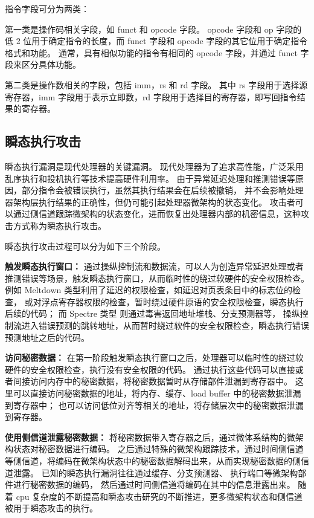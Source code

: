 指令字段可分为两类：\par

第一类是操作码相关字段，如 funct 和 opcode 字段。
opcode 字段和 op 字段的低 2 位用于确定指令的长度，而 funct 字段和 opcode 字段的其它位用于确定指令格式和功能。
通常，具有相似功能的指令有相同的 opcode 字段，并通过 funct 字段来区分具体功能。\par

第二类是操作数相关的字段，包括 imm，rs 和 rd 字段。
其中 rs 字段用于选择源寄存器，imm 字段用于表示立即数，rd 字段用于选择目的寄存器，即写回指令结果的寄存器。\par

\subsection{瞬态执行攻击}
瞬态执行漏洞是现代处理器的关键漏洞。
现代处理器为了追求高性能，广泛采用乱序执行和投机执行等技术提高硬件利用率。
由于异常延迟处理和推测错误等原因，部分指令会被错误执行，虽然其执行结果会在后续被撤销，
并不会影响处理器架构层执行结果的正确性，但仍可能引起处理器微架构的状态变化。
攻击者可以通过侧信道跟踪微架构的状态变化，进而恢复出处理器内部的机密信息，这种攻击方式称为瞬态执行攻击。\par

瞬态执行攻击过程可以分为如下三个阶段。\par

\textbf{触发瞬态执行窗口：}
通过操纵控制流和数据流，可以人为创造异常延迟处理或者推测错误等场景，触发瞬态执行窗口，从而临时性的绕过软硬件的安全权限检查。
例如 Meltdown 类型利用了延迟的权限检查，如延迟对页表条目中的标志位的检查\cite{horn2018meltdown}，
或对浮点寄存器权限的检查\cite{stecklina1806lazyfp}，暂时绕过硬件原语的安全权限检查，瞬态执行后续的代码；
而 Spectre 类型\cite{kocher2020spectre} 则通过毒害返回地址堆栈\cite{maisuradze2018ret2spec}、分支预测器等，
操纵控制流进入错误预测的跳转地址，从而暂时绕过软件的安全权限检查，瞬态执行错误预测地址之后的代码。\par

\textbf{访问秘密数据：}
在第一阶段触发瞬态执行窗口之后，处理器可以临时性的绕过软硬件的安全权限检查，执行没有安全权限的代码。
通过执行这些代码可以直接或者间接访问内存中的秘密数据，将秘密数据暂时从存储部件泄漏到寄存器中\cite{van2019ridl}\cite{van2021cacheout}。
这里可以直接访问秘密数据的地址，将内存、缓存、load buffer 中的秘密数据泄漏到寄存器中；
也可以访问低位对齐等相关的地址，将存储层次中的秘密数据泄漏到寄存器。

\textbf{使用侧信道泄露秘密数据：}
将秘密数据带入寄存器之后，通过微体系结构的微架构状态对秘密数据进行编码。
之后通过特殊的微架构跟踪技术，通过时间侧信道等侧信道，将编码在微架构状态中的秘密数据解码出来，从而实现秘密数据的侧信道泄露。
已知的瞬态执行漏洞往往通过缓存\cite{yarom2014flush+}、分支预测器\cite{evtyushkin2018branchscope}、
执行端口\cite{bhattacharyya2019smotherspectre}等微架构部件进行秘密数据的编码，
然后通过时间侧信道将编码在其中的信息泄露出来。
随着 cpu 复杂度的不断提高和瞬态攻击研究的不断推进，更多微架构状态和侧信道被用于瞬态攻击的执行。\par

